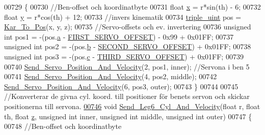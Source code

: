 \begin{DoxyCode}
00729 \{
00730     \textcolor{comment}{//Ben-offset och koordinatbyte}
00731     \textcolor{keywordtype}{float} \hyperlink{sensor_8h_a6c4b361d72eb3767ba424ac9a6ecf52b}{x} = r*sin(th) - 6;
00732     \textcolor{keywordtype}{float} \hyperlink{sensor_8h_a0ed6a908288e0cd87f79c1b5ab56d07c}{y} = r*cos(th) + 12;
00733     \textcolor{comment}{//invers kinematik }
00734     \hyperlink{structtriple__uint}{triple\_uint} pos = \hyperlink{invers__kinematik_8c_a68f82386196ad991ed54fb9796d90f7c}{Kar\_To\_Pos}(x, y, z);
00735     \textcolor{comment}{//Servo-offsets och ev. invertering }
00736     \textcolor{keywordtype}{unsigned} \textcolor{keywordtype}{int} pos1 = -(pos.\hyperlink{structtriple__uint_a0ea8a85723620c90be9fd2a693f12a59}{a} - \hyperlink{servo___u_a_r_t_8c_a4c437d01d2f060ec86c16ed5e76efe45}{FIRST\_SERVO\_OFFSET}) - 0x99 + 0x01FF;
00737     \textcolor{keywordtype}{unsigned} \textcolor{keywordtype}{int} pos2 = -(pos.\hyperlink{structtriple__uint_a790d5baa17ec7aaf7bb49750a16e9c29}{b} - \hyperlink{servo___u_a_r_t_8c_acb02dedbe5ff19694bdb5b2ddf61664a}{SECOND\_SERVO\_OFFSET}) + 0x01FF;
00738     \textcolor{keywordtype}{unsigned} \textcolor{keywordtype}{int} pos3 = -(pos.\hyperlink{structtriple__uint_a6ce17b018c47d0f1d0e53a458f741ad3}{c} - \hyperlink{servo___u_a_r_t_8c_ac2f065c44b617c91ea7f4237e8ead729}{THIRD\_SERVO\_OFFSET}) + 0x01FF;
00739     
00740     \hyperlink{servo___u_a_r_t_8c_aef28545296037ecc0350638a407a680f}{Send\_Servo\_Position\_And\_Velocity}(2, pos1, inner); \textcolor{comment}{//Servona i ben 5}
00741     \hyperlink{servo___u_a_r_t_8c_aef28545296037ecc0350638a407a680f}{Send\_Servo\_Position\_And\_Velocity}(4, pos2, middle);
00742     \hyperlink{servo___u_a_r_t_8c_aef28545296037ecc0350638a407a680f}{Send\_Servo\_Position\_And\_Velocity}(6, pos3, outer);
00743 \}
00744 
00745 \textcolor{comment}{//Konverterar de givna cyl. koord. till positioner för benets servon och skickar positionerna till servona.}
\hypertarget{servo___u_a_r_t_8c_source.tex_l00746}{}\hyperlink{servo___u_a_r_t_8h_a3f6d26397b69e462327480969aa40d1b}{00746} \textcolor{keywordtype}{void} \hyperlink{servo___u_a_r_t_8c_a3f6d26397b69e462327480969aa40d1b}{Send\_Leg6\_Cyl\_And\_Velocity}(\textcolor{keywordtype}{float} r, \textcolor{keywordtype}{float} th, \textcolor{keywordtype}{float} 
      \hyperlink{over__hinder_8c_af73583b1e980b0aa03f9884812e9fd4d}{z}, \textcolor{keywordtype}{unsigned} \textcolor{keywordtype}{int} inner, \textcolor{keywordtype}{unsigned} \textcolor{keywordtype}{int} middle, \textcolor{keywordtype}{unsigned} \textcolor{keywordtype}{int} outer)
00747 \{
00748     \textcolor{comment}{//Ben-offset och koordinatbyte}

\end{DoxyCode}
